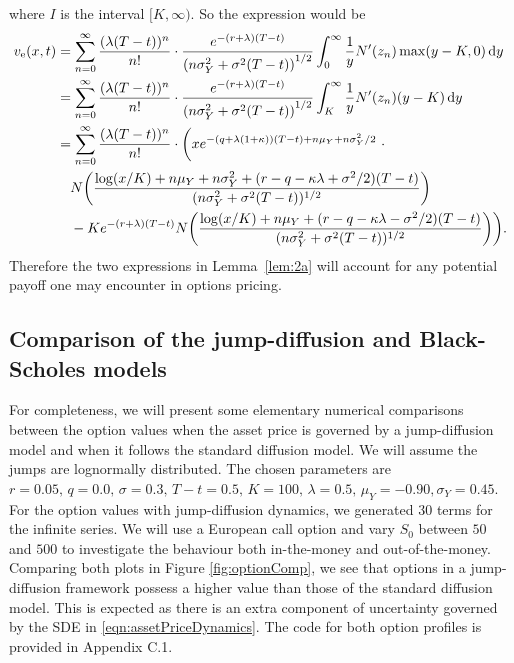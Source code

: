 {$$	$$
where $I$ is the interval $[K,\infty)$. So the expression would be
	\begin{align*}
		v_\text{e}(x,t) &=  \displaystyle\sum\limits_{n=0}^\infty\frac{(\lambda(T-t))^n}{n!}\cdot\frac{e^{-(r+\lambda)(T-t)}}{\left(n\sigma_Y^2 + \sigma^2(T-t)\right)^{1/2}}\int_0^\infty \frac{1}{y}N'(z_n) \max(y-K,0) \, \mathrm d y \\
		&= \displaystyle\sum\limits_{n=0}^\infty\frac{(\lambda(T-t))^n}{n!}\cdot\frac{e^{-(r+\lambda)(T-t)}}{\left(n\sigma_Y^2 + \sigma^2(T-t)\right)^{1/2}}\int_K^\infty \frac{1}{y}N'(z_n) (y-K) \, \mathrm d y \\
		&=  \displaystyle\sum\limits_{n=0}^\infty\frac{(\lambda(T-t))^n}{n!}\cdot\bigg( xe^{-(q+\lambda(1+\kappa))(T-t) + n\mu_Y + n\sigma_Y^2/2} \ \cdot \ \\
		&{} \quad  N\bigg( \frac{\log(x/K) + n\mu_Y + n\sigma_Y^2 + (r-q-\kappa\lambda + \sigma^2/2)(T-t)}{(n\sigma_Y^2 + \sigma^2(T-t))^{1/2}} \bigg) \\
		&{} \quad - Ke^{-(r+\lambda)(T-t)}N\bigg( \frac{\log(x/K) + n\mu_Y + (r-q-\kappa\lambda - \sigma^2/2)(T-t) }{(n\sigma_Y^2 + \sigma^2(T-t))^{1/2}} \bigg)\bigg).
			\end{align*}
Therefore the two expressions in Lemma~\ref{lem:2a} will account for any potential payoff one may encounter in options pricing.
}

\subsection{Comparison of the jump-diffusion and Black-Scholes models}
For completeness, we will present some elementary numerical comparisons between the option values when the asset price is governed by a jump-diffusion model and when it follows the standard diffusion model. We will assume the jumps are lognormally distributed. The chosen parameters are $r = 0.05, \, q = 0.0, \, \sigma = 0.3, \, T-t = 0.5, \, K = 100, \, \lambda = 0.5, \, \mu_Y = -0.90, \sigma_Y = 0.45$. For the option values with jump-diffusion dynamics, we generated 30 terms for the infinite series. We will use a European call option and vary $S_0$ between $50$ and $500$ to investigate the behaviour both in-the-money and out-of-the-money. Comparing both plots in Figure \ref{fig:optionComp}, we see that options in a jump-diffusion framework possess a higher value than those of the standard diffusion model. This is expected as there is an extra component of uncertainty governed by the SDE in \eqref{eqn:assetPriceDynamics}. The code for both option profiles is provided in Appendix C.1.

